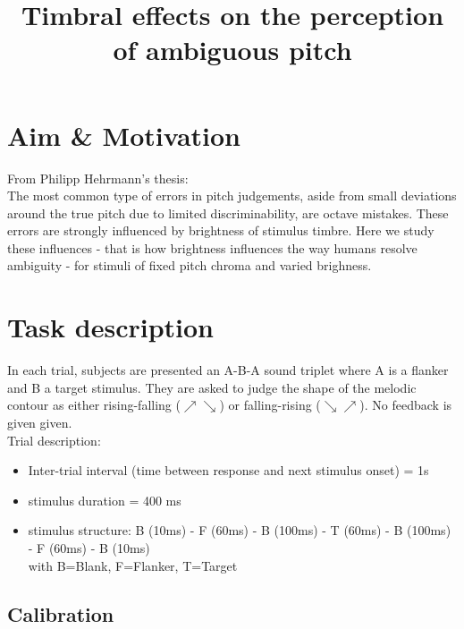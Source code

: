 \documentclass[11pt,a4paper,oneside]{article}
\begin{document}
\renewcommand{\v}[1]{\mathbf{#1}}
\newcommand{\diag}{\mathop{\mathrm{diag}}}



\title{Timbral effects on the perception of ambiguous pitch}
\date{}
\maketitle

\section{Aim \& Motivation}

From Philipp Hehrmann's thesis:\\
The most common type of errors in pitch judgements, aside from small deviations around the true pitch due to limited discriminability, are octave mistakes.
These errors are strongly influenced by brightness of stimulus timbre.
Here we study these influences - that is how brightness influences the way humans resolve ambiguity - for stimuli of fixed pitch chroma and varied brighness.

\section{Task description}

In each trial, subjects are presented an A-B-A sound triplet where A is a flanker and B a target stimulus. They  are asked to judge the shape of the melodic contour as either rising-falling ($\nearrow \searrow$) or falling-rising ($\searrow \nearrow$). No feedback is given given.\\

Trial description:
\begin{itemize}
\item Inter-trial interval (time between response and next stimulus onset) = 1s
\item stimulus duration = 400 ms
\item stimulus structure:
B (10ms) - F (60ms) - B (100ms) - T (60ms) - B (100ms) - F (60ms) - B (10ms)\\
with B=Blank, F=Flanker, T=Target
\end{itemize}

\subsection{Calibration}
\end{document}
